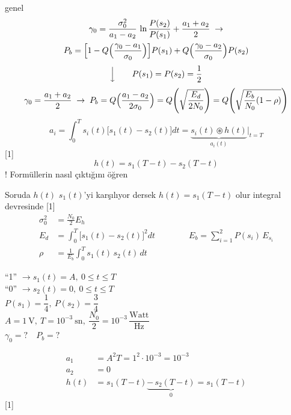 \documentclass[11pt,a4paper]{article}
\begin{document}

\textcolor{kirmizikalem}{genel}
\begin{gather*}
\gamma_0=\frac{\sigma_0^2}{a_1-a_2}\,\ln\frac{P(s_2)}{P(s_1)}+\frac{a_1+a_2}{2}\;\rightarrow\\
P_b=\Bigl[1-Q\Bigl(\frac{\gamma_0-a_1}{\sigma_0}\Bigr)\Bigr]P(s_1)+Q\Bigl(\frac{\gamma_0-a_2}{\sigma_0}\Bigr)P(s_2)
\end{gather*}
\[
\Big\downarrow\qquad P(s_1)=P(s_2)=\frac{1}{2}
\]
\[
\gamma_0=\frac{a_1+a_2}{2}\;\rightarrow\;
P_b=Q\Bigl(\frac{a_1-a_2}{2\sigma_0}\Bigr)=Q\Biggl(\sqrt{\frac{E_d}{2N_0}}\Biggr)=Q\Biggl(\sqrt{\frac{E_b}{N_0}(1-\rho)}\Biggr)
\]
\[
a_i=\int_0^T s_i(t)\bigl[s_1(t)-s_2(t)\bigr]dt=\underbrace{s_i(t)\circledast h(t)}_{a_i(t)}\Big|_{t=T}
\]
[1]
\[
h(t)=s_1(T-t)-s_2(T-t)
\]
\textcolor{kirmizikalem}{! Formüllerin nasıl çıktığını öğren}

Soruda $h(t)$ $s_1(t)$'yi karşılıyor dersek \quad $h(t)=s_1(T-t)$ olur integral devresinde
[1]
\begin{align*}
\sigma_0^2&=\frac{N_0}{2}E_h\\
E_d&=\int_0^T\bigl[s_1(t)-s_2(t)\bigr]^2dt\qquad\qquad E_b=\sum_{i=1}^{2}P(s_i)\,E_{s_i}\\
\rho&=\frac{1}{E_b}\int_0^T s_1(t)\,s_2(t)\,dt
\end{align*}
\begin{ornek}
``1'' $\rightarrow s_1(t)=A,\ 0\le t\le T$\\
``0'' $\rightarrow s_2(t)=0,\ 0\le t\le T$\\
$P(s_1)=\dfrac{1}{4},\ P(s_2)=\dfrac{3}{4}$\\
$A=1\ \mathrm{V},\ T=10^{-3}\ \mathrm{sn},\ \dfrac{N_0}{2}=10^{-3}\,\dfrac{\mathrm{Watt}}{\mathrm{Hz}}$\\
$\gamma_0=?\quad P_b=?$
\end{ornek}
\begin{align*}
a_1&=A^2T=1^2\cdot 10^{-3}=10^{-3}\\
a_2&=0\\
h(t)&=s_1(T-t)\underbrace{-\,s_2(T-t)}_{0}=s_1(T-t)
\end{align*}
[1]
\end{document}
